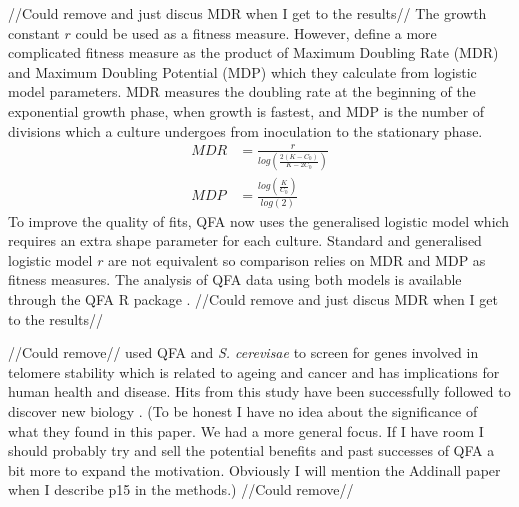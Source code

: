 //Could remove and just discus MDR when I get to the results//
The growth constant \(r\) could be used as a fitness measure. However,
\citet{Addinall2011} define a more complicated fitness measure as the
product of Maximum Doubling Rate (MDR) and Maximum Doubling Potential
(MDP) which they calculate from logistic model parameters. MDR measures
the doubling rate at the beginning of the exponential growth phase,
when growth is fastest, and MDP is the number of divisions which a
culture undergoes from inoculation to the stationary phase.
%
\begin{subequations}
  \label{eq:MDR_MDP}
    \begin{align}
      MDR &= \frac{r}{log\left(\frac{2(K-C_0)}{K-2C_0}\right)}\\
      MDP &= \frac{log\left(\frac{K}{C_0}\right)}{log(2)}
    \end{align}
\end{subequations}
%
To improve the quality of fits, QFA now uses the generalised logistic
model which requires an extra shape parameter for each
culture. Standard and generalised logistic model \(r\) are not
equivalent so comparison relies on MDR and MDP as fitness
measures. The analysis of QFA data using both models is available
through the QFA R package \citep{qfa2016}.  //Could remove and just
discus MDR when I get to the results//


//Could remove//\citet{Addinall2011} used QFA and
\textit{S. cerevisae} to screen for genes involved in telomere
stability which is related to ageing and cancer and has implications
for human health and disease. Hits from this study have been
successfully followed to discover new biology
\citep{Holstein20141259}. (To be honest I have no idea about the
significance of what they found in this paper. We had a more general
focus. If I have room I should probably try and sell the potential
benefits and past successes of QFA a bit more to expand the
motivation. Obviously I will mention the Addinall paper when I
describe p15 in the methods.)  //Could remove//


